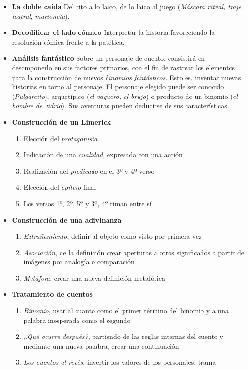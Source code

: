 \begin{itemize}
	\item {\bf La doble caída} Del rito a lo laico, de lo laico al juego ({\it Máscara ritual, traje teatral, marioneta}).
	\item {\bf Decodificar el lado cómico} Interpretar la historia
	 favoreciendo la resolución cómica frente a la patética.
	\item {\bf Análisis fantástico} Sobre un personaje de cuento, consistirá en descmponerlo en sus factores primarios, con el fin de rastrear los elementos para la construcción de nuevos {\it binomios fantásticos}. Esto es, inventar nuevas historias en torno al personaje. El personaje elegido puede ser conocido ({\it Pulgarcito}), arquetípico ({\it el vaquero, el brujo}) o producto de un binomio ({\it el hombre de vidrio}). Sus aventuras pueden deducirse de sus características.
	\item {{\bf Construcción de un Limerick}
		\begin{enumerate}
			\item Elección del {\it protagonista}
			\item Indicación de una {\it cualidad}, expresada con una acción
			\item Realización del {\it predicado} en el 3º y 4º verso
			\item Elección del {\it epíteto} final
			\item Los versos 1º, 2º, 5º y 3º, 4º riman entre sí
		\end{enumerate}}
	\item {{\bf Construcción de una adivinanza}
		\begin{enumerate}
			\item {\it Extrañamiento}, definir al objeto como visto por primera vez
			\item {\it Asociación}, de la definición crear aperturas a otros significados a partir de imágenes por analogía o comparación
			\item {\it Metáfora}, crear una nueva definición metafórica
		\end{enumerate}}
	\item {{\bf Tratamiento de cuentos}
		\begin{enumerate}
			\item {\it Binomio}, usar al cuanto como el primer término del binomio y a una palabra inesperada como el segundo
			\item {\it ¿Qué ocurre después?}, partiendo de las reglas internas del cuento y mediante una nueva palabra, crear una continuación
			\item {\it Los cuentos al revés}, invertir los valores de los personajes, trama

\end{enumerate}}
\end{itemize}
